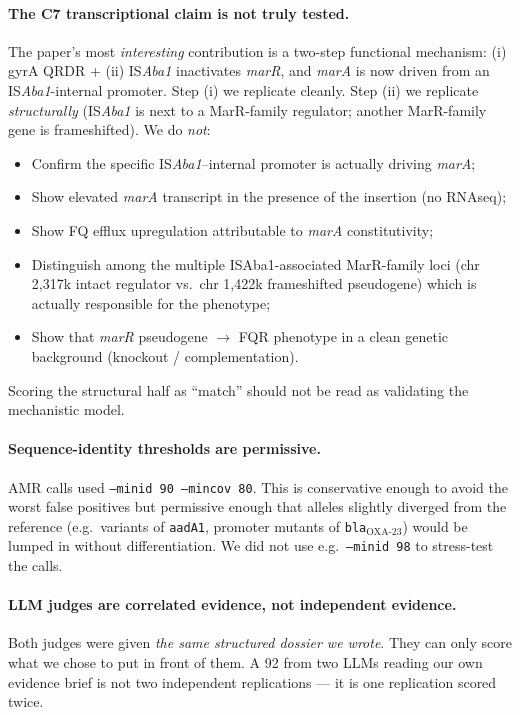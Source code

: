 \documentclass[11pt]{article}
\begin{document}
\paragraph{The C7 transcriptional claim is not truly tested.}
The paper's most \emph{interesting} contribution is a two-step
functional mechanism: (i) gyrA QRDR + (ii) IS\emph{Aba1} inactivates
\emph{marR}, and \emph{marA} is now driven from an IS\emph{Aba1}-internal
promoter.  Step (i) we replicate cleanly.  Step (ii) we replicate
\emph{structurally} (IS\emph{Aba1} is next to a MarR-family regulator;
another MarR-family gene is frameshifted).  We do \emph{not}:
\begin{itemize}[nosep]
  \item Confirm the specific IS\emph{Aba1}--internal promoter is actually
        driving \emph{marA};
  \item Show elevated \emph{marA} transcript in the presence of the
        insertion (no RNAseq);
  \item Show FQ efflux upregulation attributable to \emph{marA}
        constitutivity;
  \item Distinguish among the multiple ISAba1-associated MarR-family loci
        (chr 2{,}317k intact regulator vs.\ chr 1{,}422k frameshifted pseudogene) which is
        actually responsible for the phenotype;
  \item Show that \emph{marR} pseudogene $\to$ FQR phenotype in a
        clean genetic background (knockout / complementation).
\end{itemize}
Scoring the structural half as ``match'' should not be read as
validating the mechanistic model.

\paragraph{Sequence-identity thresholds are permissive.}
AMR calls used \texttt{--minid 90 --mincov 80}.  This is conservative
enough to avoid the worst false positives but permissive enough that
alleles slightly diverged from the reference (e.g.\ variants of
\texttt{aadA1}, promoter mutants of \texttt{bla}$_{\text{OXA-23}}$)
would be lumped in without differentiation.  We did not use e.g.\
\texttt{--minid 98} to stress-test the calls.

\paragraph{LLM judges are correlated evidence, not independent evidence.}
Both judges were given \emph{the same structured dossier we wrote}.
They can only score what we chose to put in front of them.  A 92 from
two LLMs reading our own evidence brief is not two independent
replications --- it is one replication scored twice.
\end{document}
